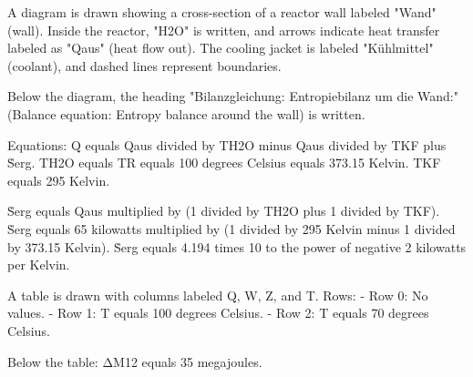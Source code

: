 A diagram is drawn showing a cross-section of a reactor wall labeled "Wand" (wall). Inside the reactor, "H2O" is written, and arrows indicate heat transfer labeled as "Qaus" (heat flow out). The cooling jacket is labeled "Kühlmittel" (coolant), and dashed lines represent boundaries.

Below the diagram, the heading "Bilanzgleichung: Entropiebilanz um die Wand:" (Balance equation: Entropy balance around the wall) is written.

Equations:  
Q equals Qaus divided by TH2O minus Qaus divided by TKF plus Ṡerg.  
TH2O equals TR equals 100 degrees Celsius equals 373.15 Kelvin.  
TKF equals 295 Kelvin.  

Ṡerg equals Qaus multiplied by (1 divided by TH2O plus 1 divided by TKF).  
Ṡerg equals 65 kilowatts multiplied by (1 divided by 295 Kelvin minus 1 divided by 373.15 Kelvin).  
Ṡerg equals 4.194 times 10 to the power of negative 2 kilowatts per Kelvin.

A table is drawn with columns labeled Q, W, Z, and T.  
Rows:  
- Row 0: No values.  
- Row 1: T equals 100 degrees Celsius.  
- Row 2: T equals 70 degrees Celsius.  

Below the table:  
ΔM12 equals 35 megajoules.